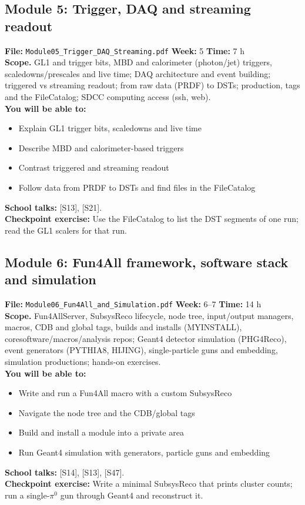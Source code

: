 \documentclass[11pt,letterpaper]{article}
\begin{document}
\subsection*{Module 5: Trigger, DAQ and streaming readout}
\textbf{File:} \texttt{Module05\_Trigger\_DAQ\_Streaming.pdf} \quad \textbf{Week:} 5 \quad \textbf{Time:} 7 h\\
\textbf{Scope.} GL1 and trigger bits, MBD and calorimeter (photon/jet) triggers, scaledowns/prescales and live time; DAQ architecture and event building; triggered vs streaming readout; from raw data (PRDF) to DSTs; production, tags and the FileCatalog; SDCC computing access (ssh, web).\\
\textbf{You will be able to:}
\begin{itemize}
\item Explain GL1 trigger bits, scaledowns and live time
\item Describe MBD and calorimeter-based triggers
\item Contrast triggered and streaming readout
\item Follow data from PRDF to DSTs and find files in the FileCatalog
\end{itemize}
\textbf{School talks:} [S13], [S21].\\
\textbf{Checkpoint exercise:} Use the FileCatalog to list the DST segments of one run; read the GL1 scalers for that run.
\medskip
\subsection*{Module 6: Fun4All framework, software stack and simulation}
\textbf{File:} \texttt{Module06\_Fun4All\_and\_Simulation.pdf} \quad \textbf{Week:} 6--7 \quad \textbf{Time:} 14 h\\
\textbf{Scope.} Fun4AllServer, SubsysReco lifecycle, node tree, input/output managers, macros, CDB and global tags, builds and installs (MYINSTALL), coresoftware/macros/analysis repos; Geant4 detector simulation (PHG4Reco), event generators (PYTHIA8, HIJING), single-particle guns and embedding, simulation productions; hands-on exercises.\\
\textbf{You will be able to:}
\begin{itemize}
\item Write and run a Fun4All macro with a custom SubsysReco
\item Navigate the node tree and the CDB/global tags
\item Build and install a module into a private area
\item Run Geant4 simulation with generators, particle guns and embedding
\end{itemize}
\textbf{School talks:} [S14], [S13], [S47].\\
\textbf{Checkpoint exercise:} Write a minimal SubsysReco that prints cluster counts; run a single-$\pi^0$ gun through Geant4 and reconstruct it.
\medskip
\end{document}
